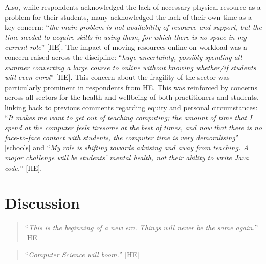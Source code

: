 \documentclass[sigconf]{acmart}
\begin{document}
Also, while respondents acknowledged the lack of necessary physical
resource as a problem for their students, many acknowledged the lack
of their own time as a key concern: ``{\emph{the main problem is not
availability of resource and support, but the time needed to acquire
skills in using them, for which there is no space in my current
role}}'' [HE]. The impact of moving resources online on workload was a
concern raised across the discipline: ``{\emph{huge uncertainty,
possibly spending all summer converting a large course to online
without knowing whether/if students will even enrol}}'' [HE]. This
concern about the fragility of the sector was particularly prominent
in respondents from HE. This was reinforced by concerns across all
sectors for the health and wellbeing of both practitioners and
students, linking back to previous comments regarding equity and
personal circumstances: ``{\emph{It makes me want to get out of
teaching computing; the amount of time that I spend at the computer
feels tiresome at the best of times, and now that there is no
face-to-face contact with students, the computer time is very
demoralising}}'' [schools] and ``{\emph{My role is shifting towards
advising and away from teaching. A major challenge will be students'
mental health, not their ability to write Java code.}}'' [HE].

\section{Discussion}\label{discussion}

\begin{quotation}
``{\emph{This is the beginning of a new era. Things will never be the
same again.}}'' [HE]
\end{quotation}

\begin{quotation}
``{\emph{Computer Science will boom.}}'' [HE]
\end{quotation}

\end{document}
